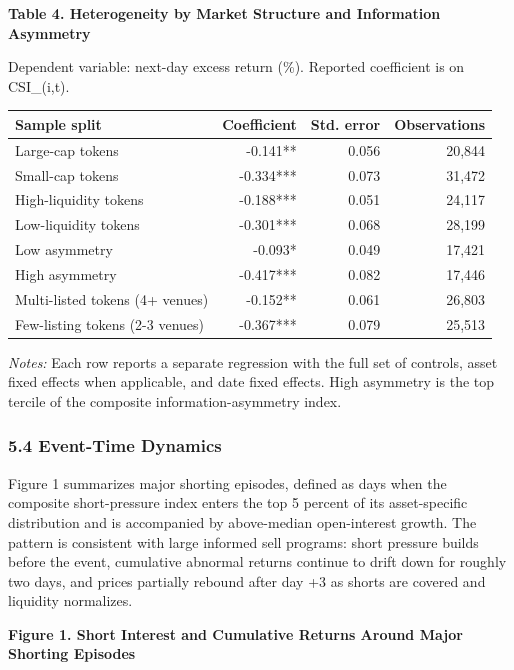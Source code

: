 \documentclass[
]{article}
\newcounter{none} %
\begin{document}
\textbf{Table 4. Heterogeneity by Market Structure and Information
Asymmetry}

Dependent variable: next-day excess return (\%). Reported coefficient is
on CSI\_(i,t).

{\def\LTcaptype{none} %
\begin{longtable}[]{@{}lrrr@{}}
\toprule\noalign{}
Sample split & Coefficient & Std. error & Observations \\
\midrule\noalign{}
\endhead
\bottomrule\noalign{}
\endlastfoot
Large-cap tokens & -0.141** & 0.056 & 20,844 \\
Small-cap tokens & -0.334*** & 0.073 & 31,472 \\
High-liquidity tokens & -0.188*** & 0.051 & 24,117 \\
Low-liquidity tokens & -0.301*** & 0.068 & 28,199 \\
Low asymmetry & -0.093* & 0.049 & 17,421 \\
High asymmetry & -0.417*** & 0.082 & 17,446 \\
Multi-listed tokens (4+ venues) & -0.152** & 0.061 & 26,803 \\
Few-listing tokens (2-3 venues) & -0.367*** & 0.079 & 25,513 \\
\end{longtable}
}

\emph{Notes:} Each row reports a separate regression with the full set
of controls, asset fixed effects when applicable, and date fixed
effects. High asymmetry is the top tercile of the composite
information-asymmetry index.

\subsubsection{5.4 Event-Time Dynamics}\label{54-event-time-dynamics}

Figure 1 summarizes major shorting episodes, defined as days when the
composite short-pressure index enters the top 5 percent of its
asset-specific distribution and is accompanied by above-median
open-interest growth. The pattern is consistent with large informed sell
programs: short pressure builds before the event, cumulative abnormal
returns continue to drift down for roughly two days, and prices
partially rebound after day +3 as shorts are covered and liquidity
normalizes.

\textbf{Figure 1. Short Interest and Cumulative Returns Around Major
Shorting Episodes}
\end{document}
